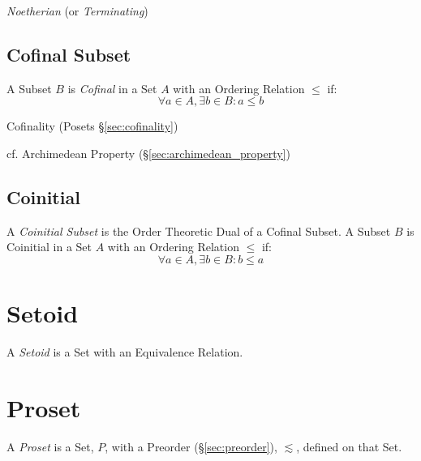 \emph{Noetherian} (or \emph{Terminating})



\subsection{Cofinal Subset}\label{sec:cofinal_subset}

A Subset $B$ is \emph{Cofinal} in a Set $A$ with an Ordering Relation
$\leq$ if:
\[
  \forall a \in A, \exists b \in B : a \leq b
\]

Cofinality (Posets \S\ref{sec:cofinality})

cf. Archimedean Property (\S\ref{sec:archimedean_property})



\subsection{Coinitial}\label{sec:coinitial_subset}

A \emph{Coinitial Subset} is the Order Theoretic Dual of a Cofinal
Subset. A Subset $B$ is Coinitial in a Set $A$ with an Ordering
Relation $\leq$ if:
\[
  \forall a \in A, \exists b \in B : b \leq a
\]



\section{Setoid}\label{sec:setoid}

A \emph{Setoid} is a Set with an Equivalence Relation.



\section{Proset}\label{sec:proset}

A \emph{Proset} is a Set, $P$, with a Preorder
(\S\ref{sec:preorder}), $\lesssim$, defined on that Set.



